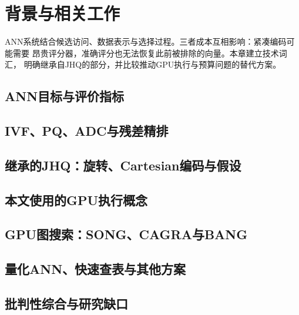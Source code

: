 \chapter{背景与相关工作}
\label{ch:background}
ANN系统结合候选访问、数据表示与选择过程。三者成本互相影响：紧凑编码可能需要
昂贵评分器，准确评分也无法恢复此前被排除的向量。本章建立技术词汇，
明确继承自JHQ的部分，并比较推动GPU执行与预算问题的替代方案。
\section{ANN目标与评价指标}
\label{sec:2-1}

\section{IVF、PQ、ADC与残差精排}
\label{sec:2-2}

\section{继承的JHQ：旋转、Cartesian编码与假设}
\label{sec:2-3}

\section{本文使用的GPU执行概念}
\label{sec:2-4}

\section{GPU图搜索：SONG、CAGRA与BANG}
\label{sec:2-5}

\section{量化ANN、快速查表与其他方案}
\label{sec:2-6}

\section{批判性综合与研究缺口}
\label{sec:2-7}

